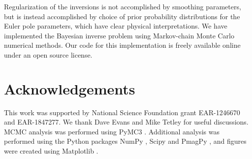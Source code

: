 \documentclass[11pt,letterpaper]{article}
\begin{document}
Regularization of the inversions is not accomplished by smoothing parameters, but is instead accomplished by choice of prior probability distributions for the Euler pole parameters, which have clear physical interpretations. We have implemented the Bayesian inverse problem using Markov-chain Monte Carlo numerical methods. Our code for this implementation is freely available online under an open source license.




\section*{Acknowledgements}
\label{sec:acknowledgements}
This work was supported by National Science Foundation grant EAR-1246670 and EAR-1847277. We thank Dave Evans and Mike Tetley for useful discussions. MCMC analysis was performed using PyMC3 \citep{Salvatier2016a}. Additional analysis was performed using the Python packages NumPy \citep{Harris2020a}, Scipy \citep{Virtanen2020a} and PmagPy \citep{Tauxe2016a}, and figures were created using Matplotlib \citep{Hunter2007a}.

\clearpage
\newpage
\footnotesize

\singlespacing



\end{document}
